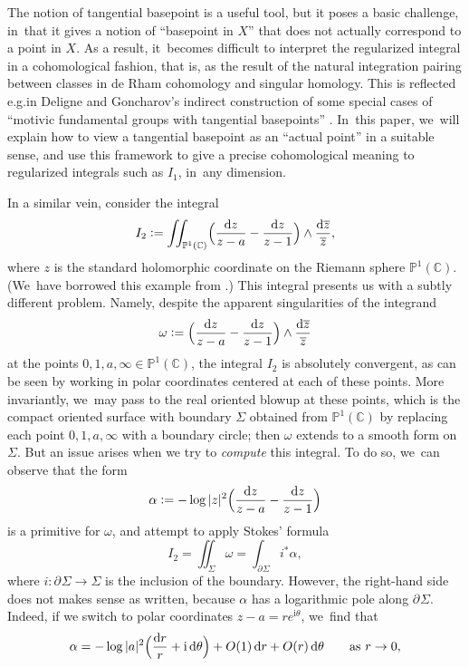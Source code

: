 \documentclass[10pt]{amsart}
\newcommand{\rBrac}[1]{\Bigl(#1\Bigr)}
\theoremstyle{definition}
\theoremstyle{remark}
\newcommand{\CC}{\mathbb{C}}
\newcommand{\PP}{\mathbb{P}}
\newcommand{\iu}{\mathrm{i}}
\newcommand{\defas}{\mathrel{\mathop:}=}
\newcommand{\zb}{\overline{z}}
\newcommand{\dd}{\mathrm{d}}
\newcommand{\dlog}[1]{\frac{\dd#1}{#1}}
\newcommand{\Sig}{\Sigma}
\newcommand{\bdSig}[1][]{\partial^{#1}\Sigma}
\providecommand{\eg}{e.g.}\providecommand{\ie}{i.e.}
\begin{document}
The notion of tangential basepoint is a useful tool, but it poses a basic challenge, in~that it gives a notion of ``basepoint in $X$'' that does not actually correspond to a point in $X$. As a result, it~becomes difficult to interpret the regularized integral in a cohomological fashion, that is, as the result of the natural integration pairing between classes in de Rham cohomology and singular homology. This is reflected \eg in Deligne and Goncharov's indirect construction of some special cases of ``motivic fundamental groups with tangential basepoints'' \cite{DeligneGoncharov}. In~this paper, we~will explain how to view a tangential basepoint as an ``actual point'' in a suitable sense, and use this framework to give a precise cohomological meaning to regularized integrals such as $I_1$, in~any dimension.

In a similar vein, consider the integral
\[
I_2 \defas \iint_{\PP^1(\CC)} \rBrac{\frac{\dd z}{z-a} - \frac{\dd z}{z-1}} \wedge \dlog{\zb},
\]
where $z$ is the standard holomorphic coordinate on the Riemann sphere $\PP^1(\CC)$. (We~have borrowed this example from \cite{BrownDupont}.) This integral presents us with a subtly different problem. Namely, despite the apparent singularities of the integrand
\[
\omega \defas \rBrac{\frac{\dd z}{z-a} - \frac{\dd z}{z-1}} \wedge \dlog{\zb}
\]
at the points $0,1,a,\infty \in \PP^1(\CC)$, the integral
$I_2$ is absolutely convergent, as can be seen by working in polar coordinates centered at each of these points. More invariantly, we~may pass to the real oriented blowup at these points, which is the compact oriented surface with boundary $\Sig$ obtained from $\PP^1(\CC)$ by replacing each point $0,1,a,\infty$ with a boundary circle; then $\omega$ extends to a smooth form on $\Sig$. But an issue arises when we try to \emph{compute} this integral. To do so, we~can observe that the form\vspace*{-3pt}
\[
\alpha \defas -\log|z|^2 \rBrac{\frac{\dd z}{z-a} - \frac{\dd z}{z-1}}
\]
is a primitive for $\omega$, and attempt to apply Stokes' formula\vspace*{-3pt}
\[
I_2=\iint_\Sig\omega = \int_{\bdSig}i^*\alpha,
\]
where $i\colon \bdSig \to \Sig$ is the inclusion of the boundary. However, the right-hand side does not makes sense as written, because $\alpha$ has a logarithmic pole along $\bdSig$. Indeed, if we switch to polar coordinates $z - a = r e^{\iu\theta}$, we~find that\vspace*{-3pt}
\[
\alpha = -\log|a|^2 \rBrac{\dlog{r} + \iu\, \dd \theta} + O(1)\,\dd r + O(r)\,\dd \theta \qquad \textrm{as }r\to 0,
\]
\end{document}

